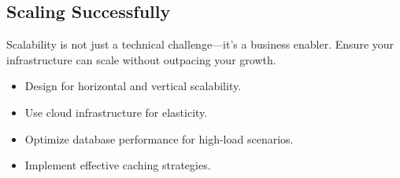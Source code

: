 

\subsection{Scaling Successfully}

Scalability is not just a technical challenge—it's a business enabler. Ensure your infrastructure can scale without outpacing your growth.

\begin{itemize}
    \item Design for horizontal and vertical scalability.
    \item Use cloud infrastructure for elasticity.
    \item Optimize database performance for high-load scenarios.
    \item Implement effective caching strategies.
\end{itemize}
